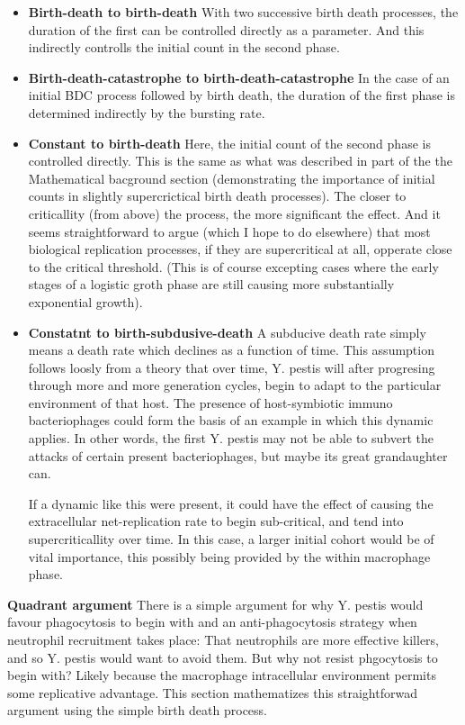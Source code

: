 \begin{itemize}
\item \textbf{Birth-death to birth-death}
With two successive birth death processes, the duration of the first can be controlled directly as a parameter.  And this indirectly controlls the initial count in the second phase.


\item \textbf{Birth-death-catastrophe to birth-death-catastrophe}
In the case of an initial BDC process followed by birth death, the duration of the first phase is determined indirectly by the bursting rate. 

\item \textbf{Constant to birth-death}
Here,  the initial count of the second phase is controlled directly. This is the same as what was described in part of the the Mathematical bacground section (demonstrating the importance of initial counts in slightly supercrictical birth death processes).  The closer to criticallity (from above) the process, the more significant the effect.  And it seems straightforward to argue (which I hope to do elsewhere) that most biological replication processes,  if they are supercritical at all, opperate close to the critical threshold. (This is of course excepting cases where the early stages of a logistic groth phase are still causing more substantially exponential growth). 


\item \textbf{Constatnt to birth-subdusive-death}  A subducive death rate simply means a death rate which declines as a function of time.  This assumption follows loosly from a theory that over time, Y. pestis will after progresing through more and more generation cycles, begin to adapt to the particular environment of that host.  The presence of host-symbiotic immuno bacteriophages could form the basis of an example in which this dynamic applies.  In other words, the first Y. pestis may not be able to subvert the attacks of certain present bacteriophages, but maybe its great grandaughter can.  \par 
If a dynamic like this were present, it could have the effect of causing the extracellular net-replication rate to begin sub-critical, and tend into supercriticallity over time. In this case, a larger initial cohort would be of vital importance,  this possibly being provided by the within macrophage phase. 
\end{itemize}


\noindent
\textbf{Quadrant argument}
There is a simple argument for why Y.  pestis would favour phagocytosis to begin with and an anti-phagocytosis strategy  when neutrophil recruitment takes place: That neutrophils are more effective killers,  and so Y. pestis would want to avoid them.  But why not resist phgocytosis to begin with? Likely because the macrophage intracellular environment permits some replicative advantage. This section mathematizes this straightforwad argument using the simple birth death process.
